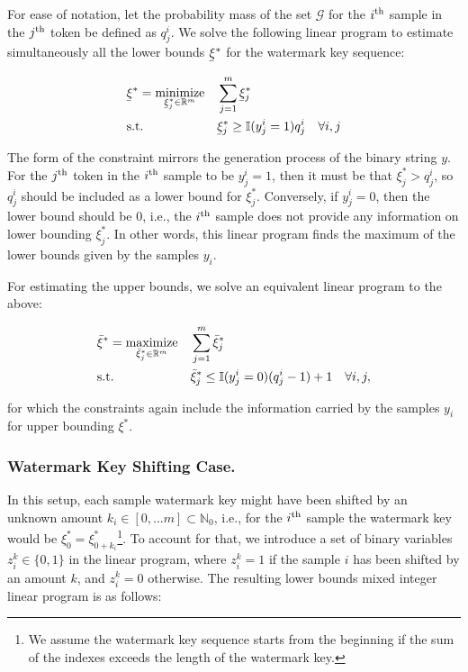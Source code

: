 For ease of notation, let the probability mass of the set $\mathcal{G}$ for the $i^{\rm th}$ sample in the $j^{\rm th}$ token be defined as $q_{j}^i$. We solve the following linear program to estimate simultaneously all the lower bounds $\ubar{\xi}^*$ for the watermark key sequence:

\begin{align}
    & \ubar{\xi}^* = \underset{\ubar{\xi}^*_j \in \mathbb{R}^m}{\text{minimize}} && \sum_{j=1}^m \ubar{\xi}^*_j \label{eq:baselower}\\
    & \text{s.t.} && \ubar{\xi}^*_j \geq  \mathbb{I}(y_{j}^i = 1) q_{j}^i \quad \forall i, j \notag
\end{align}


The form of the constraint mirrors the generation process of the binary string $y$. For the $j^{\rm th}$ token in the $i^{\rm th}$ sample to be $y_{j}^i = 1$, then it must be that $\xi^*_j > q_{j}^i$, so $q_{j}^i$ should be included as a lower bound for $\xi^*_j$. Conversely, if $y_{j}^i = 0$, then the lower bound should be $0$, i.e., the $i^{\rm th}$ sample does not provide any information on lower bounding $\xi^*_j$. In other words, this linear program finds the maximum of the lower bounds given by the samples $y_i$.

For estimating the upper bounds, we solve an equivalent linear program to the above:

\begin{align}
    & \bar{\xi}^* = \underset{\bar{\xi}^*_j \in \mathbb{R}^m}{\text{maximize}} && \sum_{j=1}^m \bar{\xi}^*_j \label{eq:baseupper}\\
    & \text{s.t.} && \bar{\xi}^*_j \leq  \mathbb{I}(y_{j}^i = 0) (q_{j}^i-1) + 1 \quad \forall i, j, \notag
\end{align}

for which the constraints again include the information carried by the samples $y_i$ for upper bounding $\xi^*$.

\subsubsection{Watermark Key Shifting Case.} In this setup, each sample watermark key might have been shifted by an unknown amount $k_i \in [0,...m] \subset \mathbb{N}_0$, i.e., for the $i^{\rm th}$ sample the watermark key would be $\xi^*_0 = \xi^*_{0+k_i}$\footnote{We assume the watermark key sequence starts from the beginning if the sum of the indexes exceeds the length of the watermark key.}. To account for that, we introduce a set of binary variables $z_i^k \in \{0,1\}$ in the linear program, where $z_i^k = 1$ if the sample $i$ has been shifted by an amount $k$, and $z_i^k = 0$ otherwise. The resulting lower bounds mixed integer linear program is as follows:


